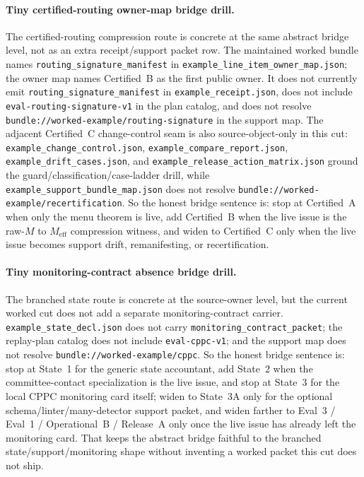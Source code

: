 \documentclass[11pt]{article}
\begin{document}
\paragraph{Tiny certified-routing owner-map bridge drill.}
The certified-routing compression route is concrete at the same abstract bridge level, not as an extra receipt/support packet row. The maintained worked bundle names \nolinkurl{routing\_signature\_manifest} in \nolinkurl{example\_line\_item\_owner\_map.json}; the owner map names Certified~B as the first public owner. It does not currently emit \nolinkurl{routing\_signature\_manifest} in \nolinkurl{example\_receipt.json}, does not include \nolinkurl{eval-routing-signature-v1} in the plan catalog, and does not resolve \nolinkurl{bundle://worked-example/routing-signature} in the support map. The adjacent Certified~C change-control seam is also source-object-only in this cut: \nolinkurl{example\_change\_control.json}, \nolinkurl{example\_compare\_report.json}, \nolinkurl{example\_drift\_cases.json}, and \nolinkurl{example\_release\_action\_matrix.json} ground the guard/classification/case-ladder drill, while \nolinkurl{example\_support\_bundle\_map.json} does not resolve \nolinkurl{bundle://worked-example/recertification}. So the honest bridge sentence is: stop at Certified~A when only the menu theorem is live, add Certified~B when the live issue is the raw-$M$ to $M_{\mathrm{eff}}$ compression witness, and widen to Certified~C only when the live issue becomes support drift, remanifesting, or recertification.\cite{series:certifiedmenus,series:certifiedB,series:recert,series:workedexample}

\paragraph{Tiny monitoring-contract absence bridge drill.}
The branched state route is concrete at the source-owner level, but the current worked cut does not add a separate monitoring-contract carrier. \nolinkurl{example_state_decl.json} does not carry \nolinkurl{monitoring_contract_packet}; the replay-plan catalog does not include \nolinkurl{eval-cppc-v1}; and the support map does not resolve \nolinkurl{bundle://worked-example/cppc}. So the honest bridge sentence is: stop at State~1 for the generic state accountant, add State~2 when the committee-contact specialization is the live issue, and stop at State~3 for the local CPPC monitoring card itself; widen to State~3A only for the optional schema/linter/many-detector support packet, and widen farther to Eval~3 / Eval~1 / Operational~B / Release~A only once the live issue has already left the monitoring card. That keeps the abstract bridge faithful to the branched state/support/monitoring shape without inventing a worked packet this cut does not ship.\cite{series:state1,series:state1A,series:mucc,series:state3,series:state3A,series:eval3,series:evalnotary,series:opB,series:release,series:workedexample}
\end{document}
